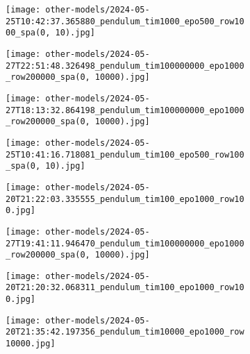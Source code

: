 \begin{figure}[H]
    \centering
    \begin{subfigure}{.47\linewidth}
        \centering
        \texttt{[image: other-models/2024-05-25T10:42:37.365880\_pendulum\_tim1000\_epo500\_row1000\_spa(0, 10).jpg]}
    \end{subfigure}
    \begin{subfigure}{.47\linewidth}
        \centering
        \texttt{[image: other-models/2024-05-27T22:51:48.326498\_pendulum\_tim100000000\_epo1000\_row200000\_spa(0, 10000).jpg]}
    \end{subfigure}
    \begin{subfigure}{.47\linewidth}
        \centering
        \texttt{[image: other-models/2024-05-27T18:13:32.864198\_pendulum\_tim100000000\_epo1000\_row200000\_spa(0, 10000).jpg]}
    \end{subfigure}
    \begin{subfigure}{.47\linewidth}
        \centering
        \texttt{[image: other-models/2024-05-25T10:41:16.718081\_pendulum\_tim100\_epo500\_row100\_spa(0, 10).jpg]}
    \end{subfigure}
\end{figure}
\begin{figure}[H]
    \centering
    \begin{subfigure}{.47\linewidth}
        \centering
        \texttt{[image: other-models/2024-05-20T21:22:03.335555\_pendulum\_tim100\_epo1000\_row100.jpg]}
    \end{subfigure}
    \begin{subfigure}{.47\linewidth}
        \centering
        \texttt{[image: other-models/2024-05-27T19:41:11.946470\_pendulum\_tim100000000\_epo1000\_row200000\_spa(0, 10000).jpg]}
    \end{subfigure}
    \begin{subfigure}{.47\linewidth}
        \centering
        \texttt{[image: other-models/2024-05-20T21:20:32.068311\_pendulum\_tim100\_epo1000\_row100.jpg]}
    \end{subfigure}
    \begin{subfigure}{.47\linewidth}
        \centering
        \texttt{[image: other-models/2024-05-20T21:35:42.197356\_pendulum\_tim10000\_epo1000\_row10000.jpg]}
    \end{subfigure}
\end{figure}
